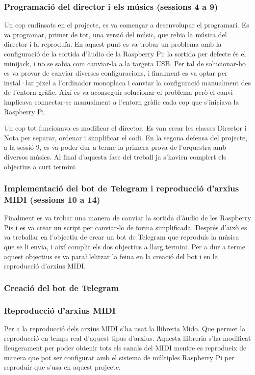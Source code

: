 \documentclass[a4paper]{paper}
\begin{document}
\subsubsection{Programació del director i els músics (sessions 4 a 9)}
Un cop endinsats en el projecte, es va començar a desenvolupar el programari. Es va programar, primer de tot, una versió del músic, que rebia la música del director i la reproduïa. En aquest punt es va trobar un problema amb la configuració de la sortida d'àudio de la Raspberry Pi: la sortida per defecte és el minijack, i no se sabia com canviar-la a la targeta USB. Per tal de solucionar-ho es va provar de canviar diverses configuracions, i finalment es va optar per instal·lar pixel a l'ordinador monoplaca i canviar la configuració manualment des de l'entorn gràfic. Així es va aconseguir solucionar el problema però el canvi implicava connectar-se manualment a l'entorn gràfic cada cop que s'iniciava la Raspberry Pi.

Un cop tot funcionava es modificar el director. Es van crear les classes Director i Nota per separar, ordenar i simplificar el codi. En la segona defensa del projecte, a la sessió 9, es va poder dur a terme la primera prova de l'orquestra amb diversos músics. Al final d'aquesta fase del treball ja s'havien complert els objectius a curt termini.

\subsubsection{Implementació del bot de Telegram i reproducció d'arxius MIDI (sessions 10 a 14)}
Finalment es va trobar una manera de canviar la sortida d'àudio de les Raspberry Pis i es va crear un script per canviar-lo de forma simplificada. Després d'això es va treballar en l'objectiu de crear un bot de Telegram que reproduís la música que se li envia, i així complir els dos objectius a llarg termini. Per a dur a terme aquest objectius es va para\l.lelitzar la feina en la creació del bot i en la reproducció d'arxius MIDI.

\subsubsection{Creació del bot de Telegram}


\subsubsection{Reproducció d'arxius MIDI}
Per a la reproducció dels arxius MIDI s'ha usat la llibreria Mido\cite{mido}. Que permet la reproducció en temps real d'aquest tipus d'arxius. Aquesta llibreria s'ha modificat lleugerament per poder obtenir tots els canals del MIDI mentre es reprodueix de manera que pot ser configurat amb el sistema de múltiples Raspberry Pi per reproduir que s'usa en aquest projecte.
\end{document}
